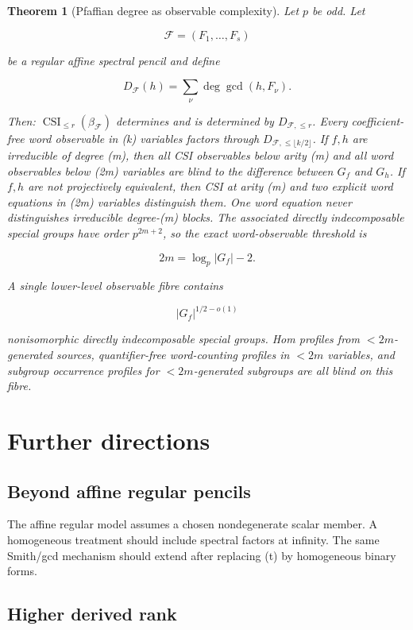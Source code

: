 \documentclass[11pt]{article}
\newtheorem{theorem}{Theorem}[section]
\begin{document}
\begin{theorem}[Pfaffian degree as observable complexity]
Let $p$ be odd. Let

\[
\mathcal F=(F_1,\ldots,F_s)
\]

be a regular affine spectral pencil and define

\[
D_{\mathcal F}(h)=\sum_\nu\deg\gcd(h,F_\nu).
\]

Then: $\operatorname{CSI}_{\le r}(\beta_{\mathcal F})$ determines and is determined by $D_{\mathcal F,\le r}$. Every coefficient-free word observable in (k) variables factors through $D_{\mathcal F,\le\lfloor k/2\rfloor}$. If $f,h$ are irreducible of degree (m), then all CSI observables below arity (m) and all word observables below (2m) variables are blind to the difference between $G_f$ and $G_h$. If $f,h$ are not projectively equivalent, then CSI at arity (m) and two explicit word equations in (2m) variables distinguish them. One word equation never distinguishes irreducible degree-(m) blocks. The associated directly indecomposable special groups have order $p^{2m+2}$, so the exact word-observable threshold is

\[
2m=\log_p|G_f|-2.
\]

A single lower-level observable fibre contains

\[
|G_f|^{1/2-o(1)}
\]

nonisomorphic directly indecomposable special groups. Hom profiles from $<2m$-generated sources, quantifier-free word-counting profiles in $<2m$ variables, and subgroup occurrence profiles for $<2m$-generated subgroups are all blind on this fibre.

\end{theorem}

\section{Further directions}

\subsection{Beyond affine regular pencils}

The affine regular model assumes a chosen nondegenerate scalar member. A homogeneous treatment should include spectral factors at infinity. The same Smith/gcd mechanism should extend after replacing (t) by homogeneous binary forms.

\subsection{Higher derived rank}
\end{document}
